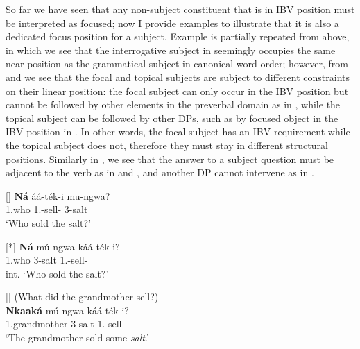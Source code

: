 \documentclass[output=paper,colorlinks,citecolor=brown,
]{langscibook}
\begin{document}
So far we have seen that any non-subject constituent that is in IBV position must be interpreted as focused; now I provide examples to illustrate that it is also a dedicated focus position for a subject. Example  is partially repeated from  above, in which we see that the interrogative subject in  seemingly occupies the same near position as the grammatical subject in canonical word order; however, from  and  we see that the focal and topical subjects are subject to different constraints on their linear position: the focal subject can only occur in the IBV position but cannot be followed by other elements in the preverbal domain as in , while the topical subject can be followed by other DPs, such as by focused object in the IBV position in . In other words, the focal subject has an IBV requirement while the topical subject does not, therefore they must stay in different structural positions. Similarly in , we see that the answer to a subject question must be adjacent to the verb as in  and , and another DP cannot intervene as in .
\begin{exe}
    \ex \label{72}
    \begin{xlist}
\ex
[]{
\label{72a}
\gll
\textbf{Ná} áá-t\'{e}k-i mu-ngwa?\\
1.who 1\Sm{}.\Pst{}-sell-\Pst{} 3-salt\\
\trans ‘Who sold the salt?’
}

\ex
[*]{
\label{72b}
\gll
\textbf{Ná} mú-ngwa káá-t\'{e}k-i?\\
1.who 3-salt 1\Sm{}.\Pst{}-sell-\Pst{}\\
\trans int. ‘Who sold the salt?’
}

\ex
[]{
\label{72c}
 (What did the grandmother sell?) \\
\gll
\textbf{Nkaaká} mú-ngwa káá-t\'{e}k-i?\\
1.grandmother 3-salt 1\Sm{}.\Pst{}-sell-\Pst{}\\
\trans ‘The grandmother sold some \textit{salt}.’
}

    \end{xlist}
\end{exe}
\end{document}
